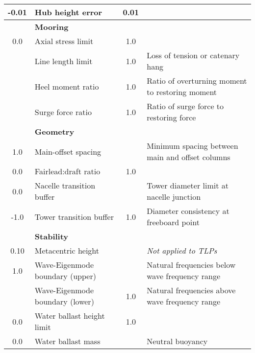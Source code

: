 \begin{table}[htbp]
\begin{center}
{\begin{tabular}{ c l c l}
  -0.01 & Hub height error & 0.01 &\\
\hline & \textbf{Mooring} &  & \\
  0.0 & Axial stress limit & 1.0 &\\
 & Line length limit & 1.0 & Loss of tension or catenary hang\\
 & Heel moment ratio & 1.0 & Ratio of overturning moment to restoring moment\\
 & Surge force ratio & 1.0 & Ratio of surge force to restoring force\\
\hline & \textbf{Geometry} &  & \\
  1.0 & Main-offset spacing &  & Minimum spacing between main and offset columns \\
  0.0 & Fairlead:draft ratio & 1.0 &\\
  0.0 & Nacelle transition buffer &  & Tower diameter limit at nacelle junction\\
  -1.0 & Tower transition buffer & 1.0 & Diameter consistency at freeboard point\\
\hline & \textbf{Stability} &  & \\
  0.10 & Metacentric height &  & \textit{Not applied to TLPs}\\
  1.0 & Wave-Eigenmode boundary (upper) &  & Natural frequencies below wave frequency range\\
 & Wave-Eigenmode boundary (lower) & 1.0 & Natural frequencies above wave frequency range\\
  0.0 & Water ballast height limit & 1.0 & \\
  0.0 & Water ballast mass &  & Neutral buoyancy\\
    \hline \end{tabular}
  }
\end{center} \end{table}
